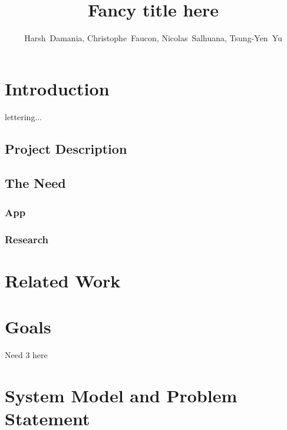 \documentclass[11pt, journal]{IEEEtran}
\begin{document}
\title{Fancy title here}

\author{Harsh~Damania, Christophe~Faucon, Nicolas~Salhuana, Tsung-Yen~Yu}


\maketitle
\IEEEdisplaynotcompsoctitleabstractindextext

\section{Introduction}
	 lettering...

	\subsection{Project Description}
	
	\subsection{The Need}

		\subsubsection{App}

		\subsubsection{Research}

\section{Related Work}

\section{Goals}
Need 3 here

\section{System Model and Problem Statement}
\end{document}
